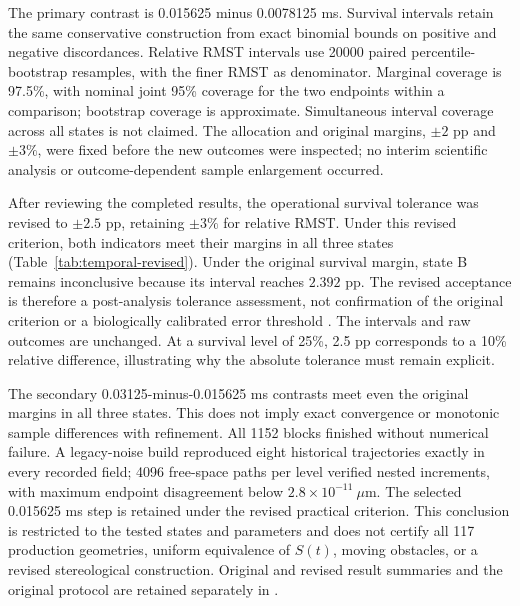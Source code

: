 \documentclass[a4paper,10pt]{article}
\numberwithin{equation}{section}
\begin{document}
The primary contrast is 0.015625 minus 0.0078125 ms. Survival intervals retain the same conservative construction from exact binomial bounds on positive and negative discordances. Relative RMST intervals use 20000 paired percentile-bootstrap resamples, with the finer RMST as denominator. Marginal coverage is 97.5\%, with nominal joint 95\% coverage for the two endpoints within a comparison; bootstrap coverage is approximate. Simultaneous interval coverage across all states is not claimed. The allocation and original margins, $\pm2$ pp and $\pm3\%$, were fixed before the new outcomes were inspected; no interim scientific analysis or outcome-dependent sample enlargement occurred.



After reviewing the completed results, the operational survival tolerance was revised to $\pm2.5$ pp, retaining $\pm3\%$ for relative RMST. Under this revised criterion, both indicators meet their margins in all three states (Table~\ref{tab:temporal-revised}). Under the original survival margin, state B remains inconclusive because its interval reaches $2.392$ pp. The revised acceptance is therefore a post-analysis tolerance assessment, not confirmation of the original criterion or a biologically calibrated error threshold \cite{Lakens2017}. The intervals and raw outcomes are unchanged. At a survival level of 25\%, 2.5 pp corresponds to a 10\% relative difference, illustrating why the absolute tolerance must remain explicit.

The secondary 0.03125-minus-0.015625 ms contrasts meet even the original margins in all three states. This does not imply exact convergence or monotonic sample differences with refinement. All 1152 blocks finished without numerical failure. A legacy-noise build reproduced eight historical trajectories exactly in every recorded field; 4096 free-space paths per level verified nested increments, with maximum endpoint disagreement below $2.8\times10^{-11}~\mu$m. The selected 0.015625 ms step is retained under the revised practical criterion. This conclusion is restricted to the tested states and parameters and does not certify all 117 production geometries, uniform equivalence of $S(t)$, moving obstacles, or a revised stereological construction. Original and revised result summaries and the original protocol are retained separately in .
\end{document}
